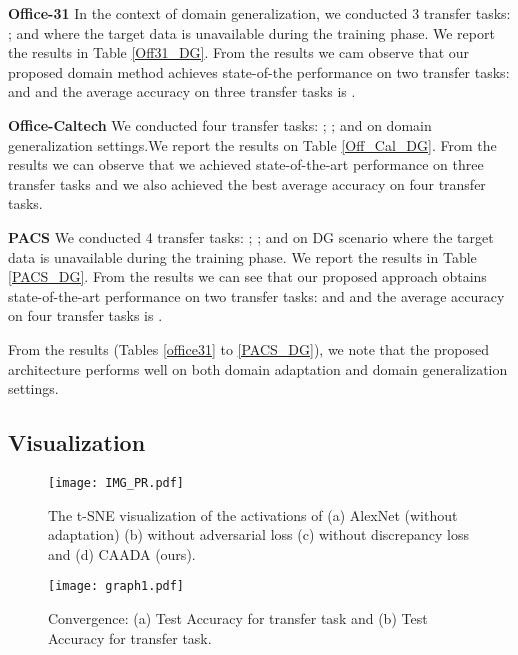 \documentclass[review]{elsarticle}
\begin{document}
\textbf{Office-31} In the context of domain generalization, we conducted 3 transfer tasks: ;  and  where the target data is unavailable during the training phase. We report the results in Table \ref{Off31_DG}. From the results we cam observe that our proposed domain method achieves state-of-the performance on two transfer tasks:  and  and the average accuracy on three transfer tasks is .


\textbf{Office-Caltech} We conducted four transfer tasks: ; ;  and  on domain generalization settings.We report the results on Table \ref{Off_Cal_DG}. From the results we can observe that we achieved state-of-the-art performance on three transfer tasks and we also achieved the best average accuracy on four transfer tasks.

\textbf{PACS} We conducted 4 transfer tasks: ; ;  and  on DG scenario where the target data is unavailable during the training phase. We report the results in Table \ref{PACS_DG}. From the results we can see that our proposed approach obtains state-of-the-art performance on two transfer tasks:  and  and the average accuracy on four transfer tasks is . 








   



From the results (Tables \ref{office31} to \ref{PACS_DG}), we note that the proposed architecture performs well on both domain adaptation and domain generalization settings.

\subsection{Visualization}


\begin{figure}
\begin{center}
\texttt{[image: IMG\_PR.pdf]}
\end{center}
   \caption{The t-SNE visualization of the activations of (a) AlexNet (without adaptation) (b) without adversarial loss (c) without discrepancy loss and (d) CAADA (ours).}
\label{fig:AW_CAFFENET}
\end{figure}

\begin{figure}
\begin{center}
\texttt{[image: graph1.pdf]}
\end{center}
   \caption{ Convergence: (a) Test Accuracy for  transfer task and (b) Test Accuracy for  transfer task.}
\label{fig:graph}
\end{figure}
\end{document}

